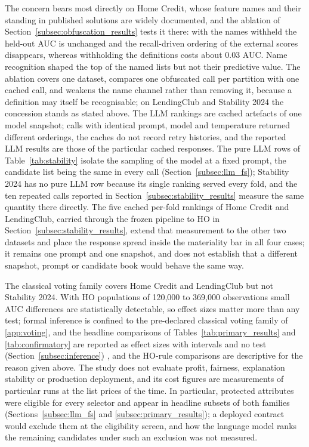 \documentclass[final,5p,twocolumn]{elsarticle}
\providecommand{\DIFaddtex}[1]{{\protect\color{blue} \sf #1}} %
\providecommand{\DIFdeltex}[1]{{\protect\color{red} \scriptsize #1}} %
\providecommand{\DIFaddbegin}{} %
\providecommand{\DIFaddend}{} %
\providecommand{\DIFdelbegin}{} %
\providecommand{\DIFdelend}{} %
\providecommand{\DIFadd}[1]{\texorpdfstring{\DIFaddtex{#1}}{#1}} %
\providecommand{\DIFdel}[1]{\texorpdfstring{\DIFdeltex{#1}}{}} %
\begin{document}
\DIFaddend The concern bears most directly on Home Credit, whose feature names and their standing in published solutions are widely documented, and the ablation of Section~\ref{subsec:obfuscation_results} tests it there: with the names withheld the held-out AUC is unchanged and the recall-driven ordering of the external scores disappears, whereas withholding the definitions costs about 0.03 AUC. Name recognition shaped the top of the named lists but not their predictive value. The ablation covers one dataset, compares one obfuscated call per partition with one cached call, and weakens the name channel rather than removing it, because a definition may itself be recognisable; on LendingClub and Stability 2024 the concession stands as stated above. The LLM rankings are cached artefacts of one model snapshot; calls with identical prompt, model and temperature returned different orderings, the caches do not record retry histories, and the reported LLM results are those of the particular cached responses. The pure LLM rows of Table~\ref{tab:stability} isolate the sampling of the model at a fixed prompt, the candidate list being the same in every call (Section~\ref{subsec:llm_fs}); Stability 2024 has no pure LLM row because its single ranking served every fold, and the ten repeated calls reported in Section~\ref{subsec:stability_results} measure the same quantity there directly. The five cached per-fold rankings of Home Credit and LendingClub, carried through the frozen pipeline to HO in Section~\ref{subsec:stability_results}, extend that measurement to the other two datasets and place the response spread inside the materiality bar in all four cases; it remains one prompt and one snapshot, and does not establish that a different snapshot, prompt or candidate book would behave the same way.

The classical voting family covers Home Credit and LendingClub but not Stability 2024. With HO populations of 120,000 to 369,000 observations small AUC differences are statistically detectable, so effect sizes matter more than any test; formal inference is confined to the pre-declared classical voting family of \ref{app:voting}, \DIFaddbegin \DIFadd{and }\DIFaddend the headline comparisons of Tables~\ref{tab:primary_results} and \ref{tab:confirmatory} are reported as effect sizes with intervals and no test (Section~\ref{subsec:inference})\DIFdelbegin \DIFdel{, and the HO-rule comparisons are descriptive for the reason given above}\DIFdelend . The study does not evaluate profit, fairness, explanation stability or production deployment, and its cost figures are measurements of particular runs at the list prices of the time. In particular, protected attributes were eligible for every selector and appear in headline subsets of both families (Sections~\ref{subsec:llm_fs} and \ref{subsec:primary_results}); a deployed contract would exclude them at the eligibility screen, and how the language model ranks the remaining candidates under such an exclusion was not measured.
\end{document}

